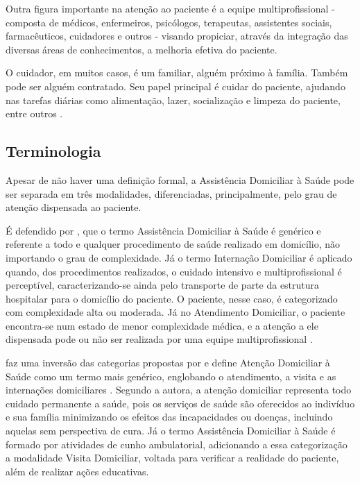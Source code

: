Outra figura importante na atenção ao paciente é a equipe multiprofissional -
composta de médicos, enfermeiros, psicólogos, terapeutas, assistentes sociais,
farmacêuticos, cuidadores e outros - visando propiciar, através da integração
das diversas áreas de conhecimentos, a melhoria efetiva do paciente.

O cuidador, em muitos casos, é um familiar, alguém próximo à família. Também
pode ser alguém contratado. Seu papel principal é cuidar do paciente, ajudando
nas tarefas diárias como alimentação, lazer, socialização e limpeza do
paciente, entre outros \cite{amaral2001assistencia}.


\subsection{Terminologia}\label{subsec:terminologia}

Apesar de não haver uma definição formal, a Assistência Domiciliar à Saúde pode
ser separada em três modalidades, diferenciadas, principalmente, pelo grau de 
atenção dispensada ao paciente. 


É defendido por , que o termo Assistência Domiciliar
à Saúde é genérico e referente a todo e qualquer procedimento de saúde realizado
em domicílio, não importando o grau de complexidade. Já o termo Internação
Domiciliar é aplicado quando, dos procedimentos realizados, o cuidado intensivo
e multiprofissional é perceptível, caracterizando-se ainda pelo transporte de
parte da estrutura hospitalar para o domicílio do paciente. O paciente, nesse
caso, é categorizado com complexidade alta ou moderada.
Já no Atendimento Domiciliar, o paciente encontra-se num estado de menor 
complexidade médica, e a atenção a ele dispensada pode ou não ser realizada por
uma equipe multiprofissional \cite{tavolari2000desenvolvimento}.

 faz uma inversão das categorias propostas
por  e  define Atenção Domiciliar à
Saúde como um termo mais genérico, englobando o atendimento, a visita e as
internações domiciliares \cite{giacomozzi2006pratica}. Segundo a autora, a
atenção domiciliar representa todo cuidado permanente a
saúde, pois os serviços de saúde são oferecidos ao indivíduo e sua família
minimizando os efeitos das incapacidades ou doenças, incluindo aquelas
sem perspectiva de cura. Já o termo Assistência Domiciliar à Saúde é formado
por atividades de cunho ambulatorial, adicionando a essa categorização a
modalidade Visita Domiciliar, voltada para verificar a realidade do paciente,
além de realizar ações educativas.


